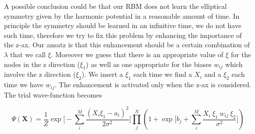 A possible conclusion could be that our RBM does not learn the elliptical symmetry given by the harmonic potential in a reasonable amount of time. In principle the symmetry should be learned in an infinitive time, we do not have such time, therefore we try to fix this problem by enhancing the importance of the z-ax. Our ansatz is that this enhancement should be a certain combination of $\lambda$ that we call $\xi$. Moreover we guess that there is an appropriate value of $\xi$ for the nodes in the z direction ($\xi_1$) as well as one appropriate for the biases $w_{ij}$ which involve the z direction ($\xi_2$). We insert a $\xi_1$ each time we find a $X_i$ and a $\xi_2$ each time we have $w_{ij}$. The enhancement is activated only when the z-ax is considered. The trial wave-function becomes

\begin{equation*}
	\label{new_trial_wf}
	\Psi(\mathbf{X}) = \frac{1}{Z} \exp\bigg[-\sum_i^M \frac{(X_i\xi_1-a_i)^2}{2\sigma^2}\bigg]\prod_j^N \left(  1 + \exp\bigg[b_j +\sum_i^M \frac{X_i\ \xi_1\ w_{ij}\ \xi_2}{\sigma^2}\bigg]\right)	
\end{equation*}

